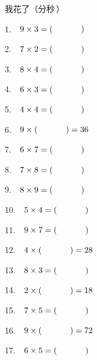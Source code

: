 \documentclass[a4paper]{extarticle}
\begin{document}
\noindent 我花了（\hspace{1cm}分\hspace{1cm}秒\,）

\vspace{0.6cm}

\begin{multicols}{3}
\raggedcolumns
\columnsep=1.5cm
\setlength{\baselineskip}{2.8\baselineskip}

1. \,\, $9 \times 3 = (\hspace{1.2cm})$

2. \,\, $7 \times 2 = (\hspace{1.2cm})$

3. \,\, $8 \times 4 = (\hspace{1.2cm})$

4. \,\, $6 \times 3 = (\hspace{1.2cm})$

5. \,\, $4 \times 4 = (\hspace{1.2cm})$

6. \,\, $9 \times (\hspace{1.2cm}) = 36$

7. \,\, $6 \times 7 = (\hspace{1.2cm})$

8. \,\, $7 \times 8 = (\hspace{1.2cm})$

9. \,\, $8 \times 9 = (\hspace{1.2cm})$

10. \,\, $5 \times 4 = (\hspace{1.2cm})$

11. \,\, $9 \times 7 = (\hspace{1.2cm})$

12. \,\, $4 \times (\hspace{1.2cm}) = 28$

13. \,\, $8 \times 3 = (\hspace{1.2cm})$

14. \,\, $2 \times (\hspace{1.2cm}) = 18$

15. \,\, $7 \times 5 = (\hspace{1.2cm})$

16. \,\, $9 \times (\hspace{1.2cm}) = 72$

\columnbreak

17. \,\, $6 \times 5 = (\hspace{1.2cm})$


\end{multicols}
\end{document}
